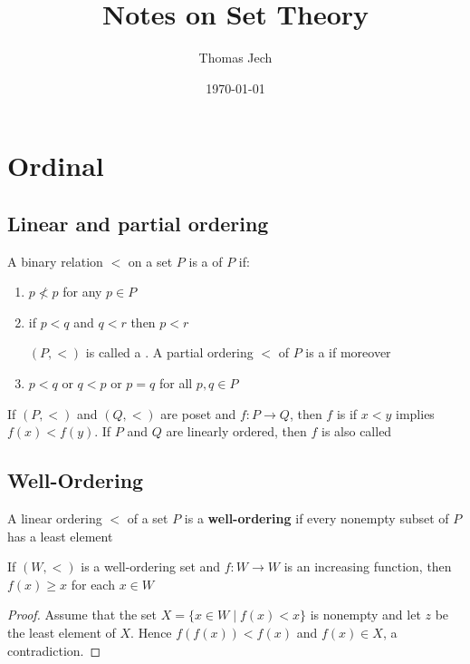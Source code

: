 \documentclass[11pt]{article}
\author{Thomas Jech}
\date{\today}
\title{Notes on Set Theory}
\begin{document}
\maketitle
\tableofcontents \clearpage
\section{Ordinal}
\label{sec:org86fcd26}
\subsection{Linear and partial ordering}
\label{sec:org7af21f6}
\begin{definition}
A binary relation \(<\) on a set \(P\) is a  of \(P\) if:
\begin{enumerate}
\item \(p\not< p\) for any \(p\in P\)
\item if \(p<q\) and \(q<r\) then \(p<r\)

\((P,<)\) is called a . A partial ordering \(<\) of
\(P\) is a  if moreover
\item \(p<q\) or \(q<p\) or \(p=q\) for all \(p,q\in P\)
\end{enumerate}
\end{definition}


If \((P,<)\) and \((Q,<)\) are poset and \(f:P\to Q\), then \(f\) is
 if \(x<y\) implies \(f(x)<f(y)\). If \(P\) and \(Q\) are
linearly ordered, then \(f\) is also called 
\subsection{Well-Ordering}
\label{sec:orgce0de94}
\begin{definition}[]
A linear ordering \(<\) of a set \(P\) is a \textbf{well-ordering} if every nonempty
subset of \(P\) has a least element
\end{definition}

\begin{lemma}[]
\label{lemma1}
If \((W,<)\) is a well-ordering set and \(f:W\to W\) is an increasing function,
then \(f(x)\ge x\) for each \(x\in W\)
\end{lemma}
\begin{proof}
Assume that the set \(X=\{x\in W\mid f(x)<x\}\) is nonempty and let \(z\) be the
least element of \(X\). Hence \(f(f(x))<f(x)\) and \(f(x)\in X\), a contradiction.
\end{proof}
\end{document}
